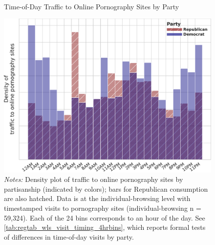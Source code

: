 \documentclass[12pt, letterpaper]{article}
\begin{document}
\begin{figure}[ht]
\centering
\caption{Time-of-Day Traffic to Online Pornography Sites by Party}
    \includegraphics[width=.75\linewidth]{figs/time-of-day-consumption-by-party.pdf}
\caption*{\footnotesize \emph{Notes:} 
        Density plot of traffic to online pornography sites by partisanship (indicated by colors); bars for Republican consumption are also hatched.
        Data is at the individual-browsing level with timestamped visits to pornography sites (individual-browsing n = 59,324).
        Each of the 24 bins corresponds to an hour of the day.
        See \cref{tab:regtab_wls_visit_timing_4hrbins}, which reports formal tests of differences in time-of-day visits by party.
	}
    \label{fig:time-of-day-consumption-by-party}
\end{figure}
\end{document}

